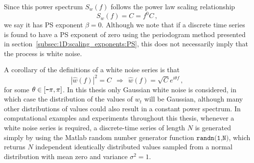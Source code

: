 {{Since this power spectrum $S_w(f)$ follows the power law scaling relationship
\begin{equation}
	S_w(f) = C = f^0 C\,,
\end{equation}
we say it has PS exponent $\beta = 0$. Although we note that if a discrete time series is found to have a PS exponent of zero using the periodogram method presented in section~\ref{subsec:1D:scaling_exponents:PS}, this does not necessarily imply that the process is white noise.

A corollary of the definitions of a white noise series is that
	\begin{equation}
	\label{eqn:1D:white_noise:corollary}
		\left|\hat{w}(f)\right|^2 = C ~~\Rightarrow~~ \hat{w}(f) = \sqrt{C}e^{i\theta f}\,,
	\end{equation}
for some $\theta\in [\textup{\texttt{-}}\pi, \pi]$. In this thesis only Gaussian white noise is considered, in which case the distribution of the values of $w_t$ will be Gaussian, although many other distributions of values could also result in a constant power spectrum. In computational examples and experiments throughout this thesis, whenever a white noise series is required, a discrete-time series of length $N$ is generated simply by using the Matlab random number generator function $\texttt{randn(1,N)}$, which returns $N$ independent identically distributed values sampled from a normal distribution with mean zero and variance $\sigma^2=1$. 

}}
